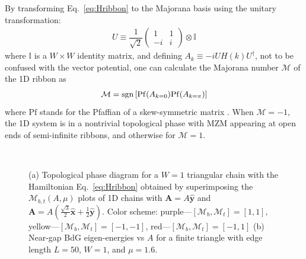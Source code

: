 \documentclass[aps,prb,twocolumn,showpacs,amsmath,amssymb,superscriptaddress]{revtex4-2}
\let\oldhat\hat
\renewcommand{\hat}[1]{\oldhat{\mathbf{#1}}}
\begin{document}
By transforming Eq.~\eqref{eq:Hribbon} to the Majorana basis using the unitary transformation:
\begin{eqnarray}
    U\equiv \dfrac{1}{\sqrt{2}} \left(
  \begin{matrix}
    1 & 1 \\
    -i & i
  \end{matrix} \right) \otimes \mathbb{I}
\end{eqnarray}
where $\mathbb{I}$ is a ${W\times W}$ identity matrix, and defining $A_k\equiv -iU H(k) U^\dag$, not to be confused with the vector potential, one can calculate the Majorana number \cite{kitaevUnpairedMajoranaFermions2001} $\mathcal{M}$ of the 1D ribbon as \cite{liTopologicalSuperconductivityInduced2014}
\begin{eqnarray}
\mathcal{M} = {\rm sgn}\left[{{\rm Pf}(A_{k=0}) {\rm Pf}(A_{k=\pi})}\right]
\end{eqnarray}
where $\text{Pf}$ stands for the Pfaffian of a skew-symmetric matrix \cite{kitaevUnpairedMajoranaFermions2001}. When $\mathcal{M} = -1$, the 1D system is in a nontrivial topological phase with MZM appearing at open ends of semi-infinite ribbons, and otherwise for $\mathcal{M} = 1$.

\begin{figure}[ht]
  \hspace{6pt}
   \\
  \vspace{-15pt}
  \caption{(a) Topological phase diagram for a $W=1$ triangular chain with the Hamiltonian Eq.~\eqref{eq:Hribbon} obtained by superimposing the $\mathcal{M}_{b,t}(A, \mu)$ plots of 1D chains with $\mathbf A = A\hat{y}$ and $\mathbf A = A(\frac{\sqrt{3}}{2}\hat{x}+\frac{1}{2}\hat{y})$. Color scheme: purple---$[\mathcal{M}_b,\mathcal{M}_t]=[1,1]$, yellow---$[\mathcal{M}_b,\mathcal{M}_t]=[-1,-1]$, red---$[\mathcal{M}_b,\mathcal{M}_t]=[-1,1]$ (b) Near-gap BdG eigen-energies vs $A$ for a finite triangle with edge length $L = 50$, $W=1$, and $\mu=1.6$.}
  \label{fig: pd}
\end{figure}
\end{document}
